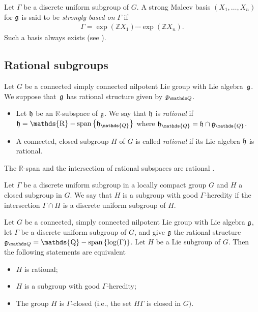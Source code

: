 \documentclass[pdftex]{sigma}
\newcommand{\set}[1]{\left\{#1\right\}}
\DeclareMathOperator{\spann}{\mathds{R}-span}
\DeclareMathOperator{\spannq}{\mathds{Q}-span}
\def\dsr{{\mathds R}}
\def\dsq{{\mathds Q}}
\begin{document}
  Let $
\Gamma$ be a discrete uniform subgroup of $G$. A strong Malcev basis
$(X_1,\dotsc,X_n)$ for $\frak g$ is said to be \textit{strongly
based on} $\Gamma$ if
\begin{gather*}%
\Gamma= \exp(\mathds{Z}X_1)\dotsb \exp(\mathds{Z}X_n).
\end{gather*}
 Such a basis always exists (see \cite{Cor1,Matsushima1}).

\subsection{Rational subgroups}\label{2.4}

\begin{definition} Let $G$ be a connected
simply connected nilpotent Lie group with Lie algebra~$\frak g$. We
suppose that~$\frak g$ has rational structure given by $\frak
g_\dsq$.
\begin{itemize}\itemsep=0pt
  \item[$(1)$]
Let  $\frak h$ be an $\mathds{R}$-subspace of $\frak g$.  We say
that $\frak h$ is \textit{rational} if $\frak h = \spann\set{\frak
h_\mathds{Q}}$ where  $\frak h_\mathds{Q}= \frak h \cap \frak
g_\mathds{Q}$.
\item[$(2)$]
 A connected, closed subgroup
$H$ of $G$ is called \textit{rational} if its Lie algebra $\frak h$
is rational.
\end{itemize}
\end{definition}


\begin{remark}\label{ratio-intersection}
The $\dsr$-span and the intersection of rational subspaces are
rational \cite[Lemma 5.1.2]{Cor1}.
\end{remark}

\begin{definition} Let $\Gamma$ be a discrete uniform subgroup in a
locally compact group $G$ and $H$ a closed subgroup in $G$. We say
that $H$ is a subgroup with good $\Gamma$-heredity if the
intersection $\Gamma\cap H$ is a discrete uniform subgroup of $H$.
\end{definition}



\begin{theorem} Let $G$ be a connected, simply connected
nilpotent Lie group with Lie algebra  $\frak g$,  let $\Gamma$ be a
discrete uniform subgroup of $G$, and give $\frak g$ the rational
structure $\frak g_\dsq = \spannq\set{\log(\Gamma)}$.  Let $H$ be a
Lie subgroup of $G$. Then  the following statements are equivalent
\begin{itemize}\itemsep=0pt
  \item[$(1)$] $H$ is rational;
  \item[$(2)$] $H$ is a subgroup with good $\Gamma$-heredity;
  \item[$(3)$] The group $H$ is $\Gamma$-closed $($i.e., the set
  $H\Gamma$ is closed in $G)$.
\end{itemize}
\end{theorem}
\end{document}
